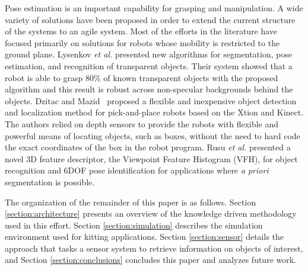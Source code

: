 Pose estimation is an important capability for grasping and manipulation. A wide variety of solutions have been proposed in order to extend the current structure
of the systems to an agile system. Most of the efforts in the literature have focused primarily on solutions for robots whose mobility is restricted to the ground
plane. Lysenkov \textit{et al.} \cite{Lysenkov-RSS-12} presented new algorithms for segmentation, pose estimation, and recognition of transparent objects.
Their system showed that a robot is able to grasp 80\% of known transparent objects with the proposed algorithm and this result is robust across non-specular
backgrounds behind the objects. Dzitac and Mazid~\cite{Dzitac.ICARCV.2012} proposed a flexible and inexpensive object detection and localization method for
pick-and-place robots based on the Xtion and Kinect. The authors relied on depth sensors to provide the robots with flexible and powerful means of locating objects,
such as boxes, without the need to hard code the exact
coordinates of the box in the robot program. Rusu \textit{et al.} \cite{RUSU.IROS.2010}  presented a novel 3D feature descriptor,
the Viewpoint Feature Histogram (VFH), for object recognition and 6DOF pose identification for applications where \textit{a priori} segmentation is possible.

 The organization of the remainder of this paper is as follows. Section \ref{section:architecture} presents an overview of the knowledge driven
 methodology used in this effort. Section \ref{section:simulation} describes the simulation environment used for kitting applications. Section \ref{section:sensor}
 details the approach that tasks a sensor system to retrieve information on objects of interest, and Section \ref{section:conclusions} concludes this paper and
 analyzes future work.
%
